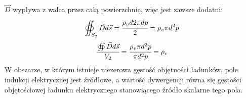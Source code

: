\begin{solution}
$\vec{D}$ wypływa z walca przez całą powierzchnię, więc jest zawsze dodatni:
$$\oiint_{S_{2}}\vec{D}d\vec{s}=\cfrac{\rho_{v}d2\pi dp}{2}=\rho_{v}\pi d^{2}p$$
$$\cfrac{\oiint\vec{D}d\vec{s}}{V_{2}}=\cfrac{\rho_{v}\pi d^{2}p}{\pi d^{2}p}=\rho_{v}$$
W obszarze, w którym istnieje niezerowa gęstość objętności ładunków, pole indukcji elektrycznej jest źródłowe, a wartość dywergencji równa się gęstości objętościowej ładunku elektrycznego stanowiącego źródło skalarne tego pola.


\end{solution}